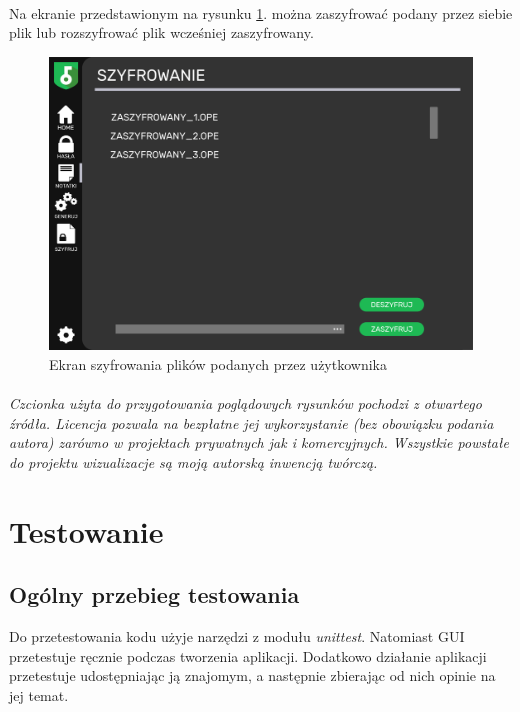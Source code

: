 \documentclass[a4paper]{article}
\begin{document}
\newpage

\paragraph{}Na ekranie przedstawionym na rysunku \ref{fig:szyfrowanie}. można zaszyfrować podany przez siebie plik lub rozszyfrować plik wcześniej zaszyfrowany.
\begin{figure}[H]
    \centering
    \includegraphics[width=1\textwidth]{img/ekran_szyfrowania.png}
    \caption{Ekran szyfrowania plików podanych przez użytkownika}
    \label{fig:szyfrowanie}
\end{figure}

\paragraph{}\textit{Czcionka użyta do przygotowania poglądowych rysunków pochodzi z otwartego źródła. Licencja pozwala na bezpłatne jej wykorzystanie (bez obowiązku podania autora) zarówno w projektach prywatnych jak i komercyjnych. Wszystkie powstałe do projektu wizualizacje są moją autorską inwencją twórczą.}

\section{Testowanie}
\subsection{Ogólny przebieg testowania}
Do przetestowania kodu użyje narzędzi z modułu \textit{unittest}. Natomiast GUI przetestuje ręcznie podczas tworzenia aplikacji. Dodatkowo działanie aplikacji przetestuje udostępniając ją znajomym, a następnie zbierając od nich opinie na jej temat.
\label{end}
\end{document}

